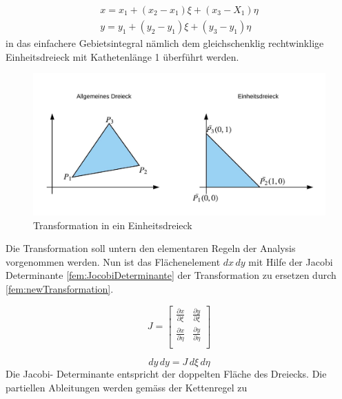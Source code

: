 \begin{equation}
			\begin{aligned}
			x = x_1 + (x_2 - x_1)\xi + (x_3 - X_1)\eta \\
			y = y_1 + (y_2 - y_1)\xi + (y_3 - y_1)\eta
			 \end{aligned}
			\label{fem:linTransformation}
\end{equation}
in das einfachere Gebietsintegral nämlich dem gleichschenklig rechtwinklige Einheitsdreieck mit Kathetenlänge 1 überführt werden.

\begin{figure}[h!]
	\centering
	\includegraphics[scale=0.6]{papers/fem/Images/Dreiecke.jpeg}
	\caption{Transformation in ein Einheitsdreieck}
	\label{fig:schemNMR_vorlage}
\end{figure}
Die Transformation soll untern den elementaren Regeln der Analysis vorgenommen werden. Nun ist das Flächenelement $dx \, dy$ mit Hilfe der Jacobi Determinante \ref{fem:JocobiDeterminante} der Transformation zu ersetzen durch \ref{fem:newTransformation}.

\begin{equation}
			J = \left[ \begin{array}{rr}
\frac{\partial x}{\partial \xi} & \frac{\partial y}{\partial \xi}  \\
\frac{\partial x}{\partial \eta} & \frac{\partial y}{\partial \eta}  \\
\end{array}\right] 
			\label{fem:JocobiDeterminante}
\end{equation}

\begin{equation}
			dy \, dy = J \, d\xi \, d\eta
			\label{fem:newTransformation}
\end{equation}
Die Jacobi- Determinante entspricht der doppelten Fläche des Dreiecks. Die partiellen Ableitungen werden gemäss der Kettenregel zu 

